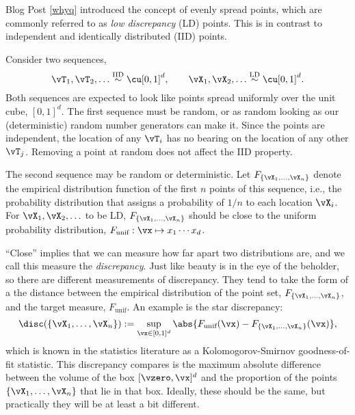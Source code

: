 Blog Post \ref{whyq} introduced the concept of evenly spread points, which are commonly referred to as \emph{low discrepancy} (LD) points.  This is in contrast to independent and identically distributed (IID) points.  

Consider two sequences,
\begin{equation}
    \vT_1, \vT_2, \ldots \overset{\text{IID}}{\sim} \cu[0,1]^d, \qquad \vX_1, \vX_2, \ldots \overset{\text{LD}}{\sim} \cu[0,1]^d.
\end{equation}
Both sequences are expected to look like points spread uniformly over the unit cube, $[0,1]^d$.  
The first sequence must be random, or as random looking as our (deterministic) random number generators can make it.  Since the points are independent, the location of any $\vT_i$ has no bearing on the location of any other $\vT_j$.  Removing a point at random does not affect the IID property.

The second sequence may be random or deterministic.  Let $F_{\{\vX_1, \ldots, \vX_n\}}$ denote the empirical distribution function of the first $n$ points of this sequence, i.e., the probability distribution that assigns a probability of $1/n$ to each location $\vX_i$.  For $\vX_1, \vX_2, \ldots$ to be LD, $F_{\{\vX_1, \ldots, \vX_n\}}$ should be close to the uniform probability distribution, $F_{\text{unif}}: \vx \mapsto x_1 \cdots x_d$.

``Close'' implies that we can measure how far apart two distributions are, and we call this measure the \emph{discrepancy}. Just like beauty is in the eye of the beholder, so there are different measurements of discrepancy.  They tend to take the form of a the distance between the empirical distribution of the point set, $F_{\{\vX_1, \ldots, \vX_n\}}$, and the target measure, $F_{\text{unif}}$. An example is the star discrepancy:
\begin{equation*}
        \disc(\{\vX_1, \ldots, \vX_n\}) : = \sup_{\vx \in [0,1]^d}  \abs{F_{\text{unif}} (\vx) - F_{\{\vX_1, \ldots, \vX_n\}}(\vx)},
\end{equation*}
which is known in the statistics literature as a Kolomogorov-Smirnov goodness-of-fit statistic.  This discrepancy compares is the maximum absolute difference between the volume of the box $[\vzero,\vx]^d$ and the proportion of the points $\{\vX_1, \ldots, \vX_n\}$ that lie in that box.  Ideally, these should be the same, but practically they will be at least a bit different.

